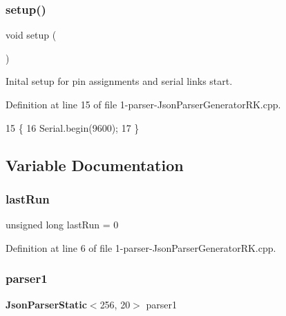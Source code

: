 \subsubsection{setup()}
{\footnotesize\ttfamily void setup (\begin{DoxyParamCaption}{ }\end{DoxyParamCaption})}



Inital setup for pin assignments and serial links start. 



Definition at line 15 of file 1-\/parser-\/\+Json\+Parser\+Generator\+R\+K.\+cpp.


\begin{DoxyCode}
15              \{
16     Serial.begin(9600);
17 \}
\end{DoxyCode}


\subsection{Variable Documentation}
\mbox{\label{1-parser-_json_parser_generator_r_k_8cpp_a5082951a06f690a0623ea99ed4228392}} 
\subsubsection{last\+Run}
{\footnotesize\ttfamily unsigned long last\+Run = 0}



Definition at line 6 of file 1-\/parser-\/\+Json\+Parser\+Generator\+R\+K.\+cpp.

\mbox{\label{1-parser-_json_parser_generator_r_k_8cpp_aa77335196b9c1b8ba3d649f2f381a009}} 
\subsubsection{parser1}
{\footnotesize\ttfamily \textbf{ Json\+Parser\+Static}$<$256, 20$>$ parser1}



